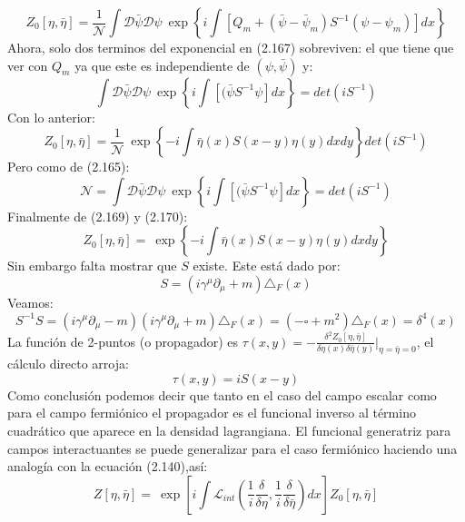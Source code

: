 \begin{equation}
Z_{0}[\eta,\bar{\eta}]=\frac{1}{\mathcal{N}}\int\mathcal{D}\bar{\psi}\mathcal{\mathcal{D}}\psi\ \exp\left\{ i\int\left[Q_{m}+(\bar{\psi}-\bar{\psi}_{m})S^{-1}(\psi-\psi_{m})\right]dx\right\} 
\end{equation}
Ahora, solo dos terminos del exponencial en (2.167) sobreviven: el que tiene que ver con $Q_m$ ya que este es independiente de $(\psi,\bar{\psi})$ y:
\begin{equation}
\int\mathcal{D}\bar{\psi}\mathcal{\mathcal{D}}\psi\ \exp\left\{ i\int\left[(\bar{\psi}S^{-1}\psi\right]dx\right\} =det(iS^{-1})
\end{equation}
Con lo anterior:
\begin{equation}
Z_{0}[\eta,\bar{\eta}]=\frac{1}{\mathcal{N}}\ \exp\left\{ -i\int\bar{\eta}(x)S(x-y)\eta(y)dxdy\right\} det(iS^{-1})
\end{equation}
Pero como de (2.165):
\begin{equation}
\mathcal{N}=\int\mathcal{D}\bar{\psi}\mathcal{\mathcal{D}}\psi\ \exp\left\{ i\int\left[(\bar{\psi}S^{-1}\psi\right]dx\right\} =det(iS^{-1})
\end{equation}
Finalmente de (2.169) y (2.170):
\begin{equation}
Z_{0}[\eta,\bar{\eta}]=\ \exp\left\{ -i\int\bar{\eta}(x)S(x-y)\eta(y)dxdy\right\} 
\end{equation}
Sin embargo falta mostrar que $S$ existe. Este está dado por:
\begin{equation}
S=(i\gamma^{\mu}\partial_{\mu}+m)\triangle_{F}(x)
\end{equation}
Veamos:
\begin{equation}
S^{-1}S=(i\gamma^{\mu}\partial_{\mu}-m)(i\gamma^{\mu}\partial_{\mu}+m)\triangle_{F}(x)=(-\square+m^{2})\triangle_{F}(x)=\delta^{4}(x)
\end{equation}
La función de 2-puntos (o propagador) es $\tau(x,y)=-\frac{\delta^{2}Z_{0}[\eta,\bar{\eta}]}{\delta\eta(x)\delta\bar{\eta}(y)}|_{\eta=\bar{\eta}=0}$, el cálculo directo arroja:
\begin{equation}
\tau(x,y)=iS(x-y)
\end{equation}
Como conclusión podemos decir que tanto en el caso del campo escalar como para el campo fermiónico el propagador es el funcional inverso al término cuadrático que aparece en la densidad lagrangiana. El funcional generatriz para campos interactuantes se puede generalizar para el caso fermiónico haciendo una analogía con la ecuación (2.140),así:
\begin{equation}
Z[\eta,\bar{\eta}]=\ \exp\left[i\int\mathcal{L}_{int}\left(\frac{1}{i}\frac{\delta}{\delta\eta},\frac{1}{i}\frac{\delta}{\delta\bar{\eta}}\right)dx\right]Z_{0}[\eta,\bar{\eta}]
\end{equation}

